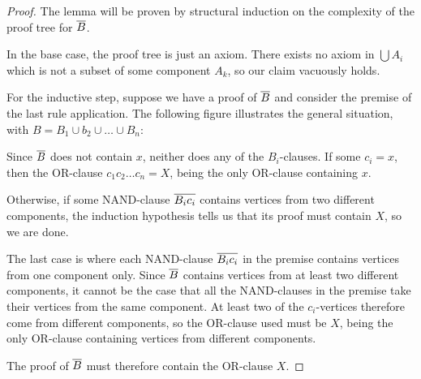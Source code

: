 \begin{proof}
  The lemma will be proven by structural induction on the complexity of the proof tree for $\ol{B}$.

  In the base case, the proof tree is just an axiom.
  There exists no axiom in $\bigcup{A_i}$ which is not a subset of some component $A_k$, so our claim vacuously holds.

  For the inductive step, suppose we have a proof of $\ol{B}$ and consider the premise of the last rule application.
  The following figure illustrates the general situation, with $B = B_1 \cup b_2 \cup \dots \cup B_n$:\par
  \begin{figure}[!h]
    \centering
    \begin{prooftree*}
      \Hypo{\dots}
      \Hypo{\dots}
      \Hypo{\dots}
      \Hypo{\dots}
    \end{prooftree*}
    \caption{}
    \label{fig:B_proof}
  \end{figure}
  \FloatBarrier
  Since $\ol{B}$ does not contain $x$, neither does any of the $B_i$-clauses.
  If some $c_i = x$, then the OR-clause $c_1c_2\dots c_n = X$, being the only OR-clause containing $x$.

  Otherwise, if some NAND-clause $\ol{B_ic_i}$ contains vertices from two different components, the induction hypothesis tells us that its proof must contain $X$, so we are done.

  The last case is where each NAND-clause $\ol{B_ic_i}$ in the premise contains vertices from one component only.
  Since $\ol{B}$ contains vertices from at least two different components, it cannot be the case that all the NAND-clauses in the premise take their vertices from the same component.
  At least two of the $c_i$-vertices therefore come from different components, so the OR-clause used must be $X$, being the only OR-clause containing vertices from different components.

  The proof of $\ol{B}$ must therefore contain the OR-clause $X$.
\end{proof}
